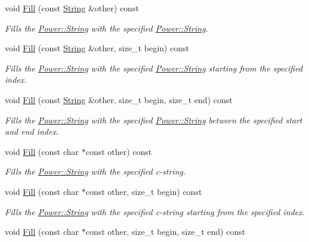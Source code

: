 \begin{DoxyCompactItemize}
void \hyperlink{class_power_1_1_string_a6ad45299bb33d665b9536afac8508193}{Fill} (const \hyperlink{class_power_1_1_string}{String} \&other) const
\begin{DoxyCompactList}\small\item\em Fills the \hyperlink{class_power_1_1_string}{Power\+::\+String} with the specified \hyperlink{class_power_1_1_string}{Power\+::\+String}. \end{DoxyCompactList}\item 
void \hyperlink{class_power_1_1_string_a041bb71b50c121cddc1d70120158f358}{Fill} (const \hyperlink{class_power_1_1_string}{String} \&other, size\+\_\+t begin) const
\begin{DoxyCompactList}\small\item\em Fills the \hyperlink{class_power_1_1_string}{Power\+::\+String} with the specified \hyperlink{class_power_1_1_string}{Power\+::\+String} starting from the specified index. \end{DoxyCompactList}\item 
void \hyperlink{class_power_1_1_string_ac403ebc4bbb897d41bc8c141dee83209}{Fill} (const \hyperlink{class_power_1_1_string}{String} \&other, size\+\_\+t begin, size\+\_\+t end) const
\begin{DoxyCompactList}\small\item\em Fills the \hyperlink{class_power_1_1_string}{Power\+::\+String} with the specified \hyperlink{class_power_1_1_string}{Power\+::\+String} between the specified start and end index. \end{DoxyCompactList}\item 
void \hyperlink{class_power_1_1_string_a036580e1df3637db23e5e359f497200b}{Fill} (const char $\ast$const other) const
\begin{DoxyCompactList}\small\item\em Fills the \hyperlink{class_power_1_1_string}{Power\+::\+String} with the specified c-\/string. \end{DoxyCompactList}\item 
void \hyperlink{class_power_1_1_string_abc080efd52260d3c9f5c8a39e7108c94}{Fill} (const char $\ast$const other, size\+\_\+t begin) const
\begin{DoxyCompactList}\small\item\em Fills the \hyperlink{class_power_1_1_string}{Power\+::\+String} with the specified c-\/string starting from the specified index. \end{DoxyCompactList}\item 
void \hyperlink{class_power_1_1_string_a47b7175afd5bd1cdfd1d970d42e78b2d}{Fill} (const char $\ast$const other, size\+\_\+t begin, size\+\_\+t end) const

\end{DoxyCompactItemize}
